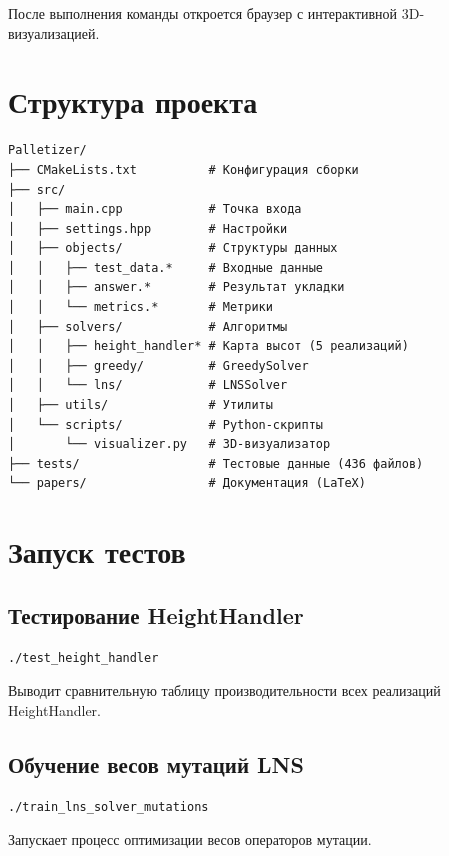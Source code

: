 После выполнения команды откроется браузер с интерактивной 3D-визуализацией.

\section{Структура проекта}

\begin{verbatim}
Palletizer/
├── CMakeLists.txt          # Конфигурация сборки
├── src/
│   ├── main.cpp            # Точка входа
│   ├── settings.hpp        # Настройки
│   ├── objects/            # Структуры данных
│   │   ├── test_data.*     # Входные данные
│   │   ├── answer.*        # Результат укладки
│   │   └── metrics.*       # Метрики
│   ├── solvers/            # Алгоритмы
│   │   ├── height_handler* # Карта высот (5 реализаций)
│   │   ├── greedy/         # GreedySolver
│   │   └── lns/            # LNSSolver
│   ├── utils/              # Утилиты
│   └── scripts/            # Python-скрипты
│       └── visualizer.py   # 3D-визуализатор
├── tests/                  # Тестовые данные (436 файлов)
└── papers/                 # Документация (LaTeX)
\end{verbatim}


\section{Запуск тестов}

\subsection{Тестирование HeightHandler}
\begin{verbatim}
./test_height_handler
\end{verbatim}

Выводит сравнительную таблицу производительности всех реализаций HeightHandler.

\subsection{Обучение весов мутаций LNS}
\begin{verbatim}
./train_lns_solver_mutations
\end{verbatim}

Запускает процесс оптимизации весов операторов мутации.

